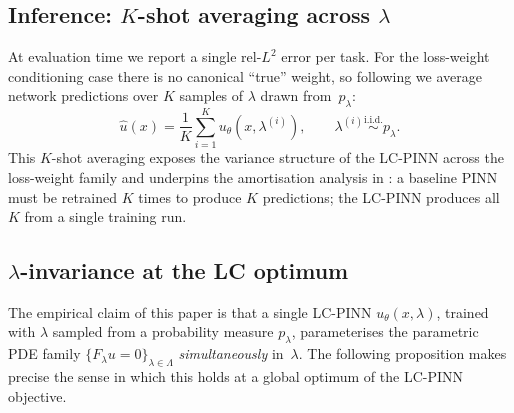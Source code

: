 \documentclass{article}
\theoremstyle{plain}
\theoremstyle{definition}
\theoremstyle{remark}
\begin{document}
\subsection{Inference: $K$-shot averaging across $\lambda$}
\label{sec:k-shot}

At evaluation time we report a single rel-$L^2$ error per task. For
the loss-weight conditioning case there is no canonical ``true''
weight, so following \citet{dosovitskiy2020} we average network
predictions over $K$ samples of $\lambda$ drawn from~$p_\lambda$:
\begin{equation}
   \hat u(x) = \frac{1}{K}\sum_{i=1}^{K} u_\theta(x, \lambda^{(i)}),
   \qquad \lambda^{(i)} \stackrel{\text{i.i.d.}}{\sim} p_\lambda .
\label{eq:k-shot}
\end{equation}
This $K$-shot averaging exposes the variance structure of the
LC-PINN across the loss-weight family and underpins the amortisation
analysis in : a baseline PINN must be retrained
$K$ times to produce $K$ predictions; the LC-PINN produces all $K$
from a single training run.

\subsection{$\lambda$-invariance at the LC optimum}

\label{sec:theorem}

The empirical claim of this paper is that a single LC-PINN
$u_\theta(x,\lambda)$, trained with $\lambda$ sampled from a probability
measure $p_\lambda$, parameterises the parametric PDE family
$\{F_\lambda u = 0\}_{\lambda \in \Lambda}$ \emph{simultaneously}
in~$\lambda$. The following proposition makes precise the sense in
which this holds at a global optimum of the LC-PINN objective.
\end{document}
